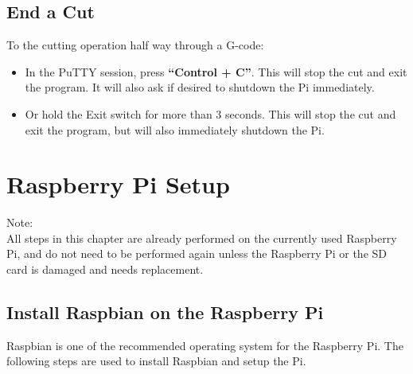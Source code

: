 \documentclass[titlepage,12pt,letter]{report}
\numberwithin{equation}{chapter}
\begin{document}
\section{End a Cut}
To the cutting operation half way through a G-code:
\begin{itemize}[noitemsep,topsep=0pt]
	\item In the PuTTY session, press \textbf{``Control + C''}. This will stop the cut and exit the program. It will also ask if desired to shutdown the Pi immediately.
	\item Or hold the Exit switch for more than 3 seconds. This will stop the cut and exit the program, but will also immediately shutdown the Pi.
\end{itemize}



\newpage
\chapter{Raspberry Pi Setup}
\begin{tcolorbox}
	{\large
		Note: \\
		All steps in this chapter are already performed on the currently used Raspberry Pi, and do not need to be performed again unless the Raspberry Pi or the SD card is damaged and needs replacement. 
	}
\end{tcolorbox}

\section{Install Raspbian on the Raspberry Pi}
Raspbian is one of the recommended operating system for the Raspberry Pi. The following steps are used to install Raspbian and setup the Pi.
\end{document}

